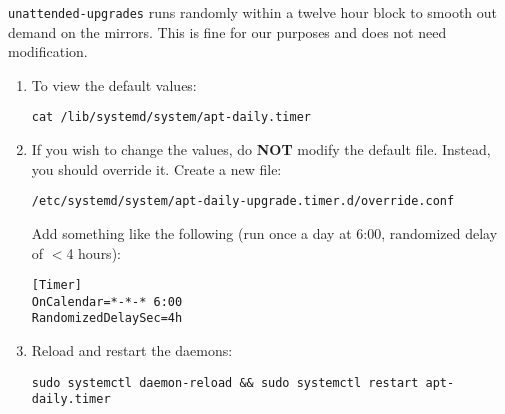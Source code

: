 \texttt{unattended-upgrades} runs randomly within a twelve hour block to smooth out demand on the mirrors. This is fine for our purposes and does not need modification.

	\begin{enumerate}
	\item To view the default values: 

	\texttt{cat /lib/systemd/system/apt-daily.timer}
	
	\item If you wish to change the values, do \textbf{NOT} modify the default file. Instead, you should override it. Create a new file:

	\texttt{/etc/systemd/system/apt-daily-upgrade.timer.d/override.conf}

	Add something like the following (run once a day at 6:00, randomized delay of $<$4 hours):
	\begin{verbatim}
[Timer]
OnCalendar=*-*-* 6:00
RandomizedDelaySec=4h
	\end{verbatim}

	\item Reload and restart the daemons:
	\begin{verbatim}
sudo systemctl daemon-reload && sudo systemctl restart apt-daily.timer
	\end{verbatim}
	
\end{enumerate}

